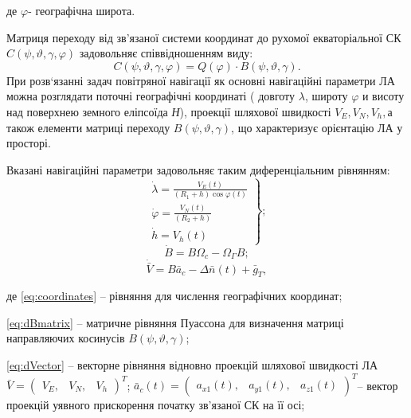 де $\varphi $- географічна широта.

Матриця переходу від зв'язаної системи координат до рухомої екваторіальної СК $C(\psi ,\vartheta,\gamma ,\varphi)$ 
задовольняє співвідношенням виду:
\[C\left(\psi ,\vartheta ,\gamma ,\varphi \right)=
Q\left(\varphi \right)\cdot B\left(\psi ,\vartheta ,\gamma \right).\] 
При розв`язанні задач повітряної навігації як основні навігаційні параметри ЛА можна 
розглядати поточні географічні координаті ( довготу $\lambda $, широту $\varphi $ и 
висоту над поверхнею земного еліпсоїда \textit{Н}), проекції шляхової швидкості $V_{E} 
,V_{N} ,V_{h} ,$а також елементи матриці переходу $B\left(\psi ,\vartheta ,\gamma 
\right)$, що характеризує орієнтацію ЛА у просторі.

Вказані навігаційні параметри задовольняє таким диференціальним рівнянням:
\begin{equation}
\left .
\begin{array}{l} 
{\dot{\lambda }=
\frac{V_{E} \left(t\right)}{\left(R_{1}+h\right)\cos \varphi \left(t\right)} } \\ 
{\dot{\varphi }=\frac{V_{N} \left(t\right)}{\left(R_{2} +h\right)} } \\
{\dot{h}=V_{h} \left(t\right)} \end{array}\right\};
\label{eq:coordinates}
\end{equation}
\begin{equation}
\dot{B}=B\Omega_{c} -\Omega_{\Gamma}B ;               
\label{eq:dBmatrix}
\end{equation}
\begin{equation}
\dot{\bar{V}}=B\bar{a}_{c} -\Delta \bar{n}\left(t\right)+\bar{g}_{T} ,     
\label{eq:dVector}
\end{equation}
\begin{ESKDexplanation}
\item де \eqref{eq:coordinates} -- рівняння для числення географічних координат; 
\item \eqref{eq:dBmatrix} -- матричне рівняння Пуассона для визначення матриці 
направляючих косинусів $B\left(\psi ,\vartheta ,\gamma \right)$; 
\item \eqref{eq:dVector} -- векторне рівняння відновно 
проекцій шляхової швидкості ЛА 
$\bar{V}=\left(\begin{array}{ccc} {V_{E} ,} & {V_{N} 
,} & {V_{h} } \end{array}\right)^{T} $; $\bar{a}_{c} \left(t\right)=\left(\begin{array}{ccc} 
{a_{x1} \left(t\right),} & {a_{y1} \left(t\right),} & {a_{z1} \left(t\right)} \end{array}
\right)^{T} $-- вектор проекцій уявного прискорення початку зв'язаної СК на її осі;
\end{ESKDexplanation}
